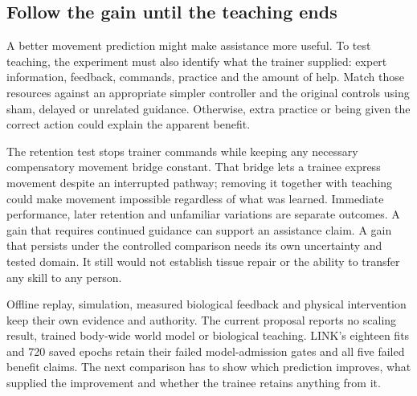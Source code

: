 \subsection{Follow the gain until the teaching ends}

A better movement prediction might make assistance more useful. To test teaching, the experiment must also identify what the trainer supplied: expert information, feedback, commands, practice and the amount of help. Match those resources against an appropriate simpler controller and the original controls using sham, delayed or unrelated guidance. Otherwise, extra practice or being given the correct action could explain the apparent benefit.

The retention test stops trainer commands while keeping any necessary compensatory movement bridge constant. That bridge lets a trainee express movement despite an interrupted pathway; removing it together with teaching could make movement impossible regardless of what was learned. Immediate performance, later retention and unfamiliar variations are separate outcomes. A gain that requires continued guidance can support an assistance claim. A gain that persists under the controlled comparison needs its own uncertainty and tested domain. It still would not establish tissue repair or the ability to transfer any skill to any person.

Offline replay, simulation, measured biological feedback and physical intervention keep their own evidence and authority. The current proposal reports no scaling result, trained body-wide world model or biological teaching. LINK's eighteen fits and 720 saved epochs retain their failed model-admission gates and all five failed benefit claims. The next comparison has to show which prediction improves, what supplied the improvement and whether the trainee retains anything from it.

